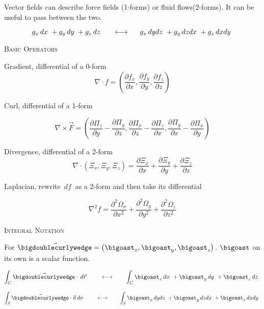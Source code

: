 \documentclass{article}
\begin{document}
\smallskip

Vector fields can describe force fields (1-forms) or fluid flows(2-forms).  It can be useful to pass between the two.

\[
g_x\,dx\ + g_y\,dy\ + g_z\,dz\ \hspace{5mm} \longleftrightarrow \hspace{5mm} g_x\,dydz\ + g_y\,dzdx\ + g_z\,dxdy\
\]

\bigskip

\textsc{Basic Operators}

Gradient, differential of a 0-form
\[
\nabla\cdot f = \left( \frac{\partial{f_x}}{\partial{x}}, \frac{\partial{f_y}}{\partial{y}}, \frac{\partial{f_z}}{\partial{z}} \right)
\]

\smallskip

Curl, differential of a 1-form

\[
\nabla \times \vec{F} = \left( \frac{\partial{\Pi_z}}{\partial{y}} - \frac{\partial{\Pi_y}}{\partial{z}}, \frac{\partial{\Pi_x}}{\partial{z}} - \frac{\partial{\Pi_z}}{\partial{x}}, \frac{\partial{\Pi_y}}{\partial{x}} - \frac{\partial{\Pi_x}}{\partial{y}} \right)
\]

\smallskip

Divergence, differential of a 2-form
\[
\nabla \cdot (\Xi_x, \Xi_y, \Xi_z) = \frac{\partial{\Xi_x}}{\partial{x}} +\frac{\partial{\Xi_y}}{\partial{y}} + \frac{\partial{\Xi_z}}{\partial{z}}
\]

\smallskip

Laplacian, rewrite $\,df\ $ as a 2-form and then take its differential

\[
\nabla^2 f = \frac{\partial^2{\Omega_x}}{\partial{x}^2} + \frac{\partial^2{\Omega_y}}{\partial{y}^2} + \frac{\partial^2{\Omega_z}}{\partial{z}^2}
\]

\bigskip

\textsc{Integral Notation}

For $\vec{\bigdoublecurlywedge} =\left( \bigoast_x , \bigoast_y , \bigoast_z  \right) $.  $\bigoast$ on its own is a scalar function.

\[
 \int_C \vec{\bigdoublecurlywedge} \cdot \,d\vec{r}\ \hspace{7mm} \longleftrightarrow \hspace{7mm} \int_C \bigoast_x\,dx\ + \bigoast_y\,dy\ + \bigoast_z\,dz\  
\]

\[
 \int_S \vec{\bigdoublecurlywedge} \cdot \vec{n} \,d\sigma\ \hspace{7mm} \longleftrightarrow \hspace{7mm} \int_S \bigoast_x \,dydz\ + \bigoast_y \,dzdx\ + \bigoast_z \,dxdy\ 
\]
 
\end{document}
